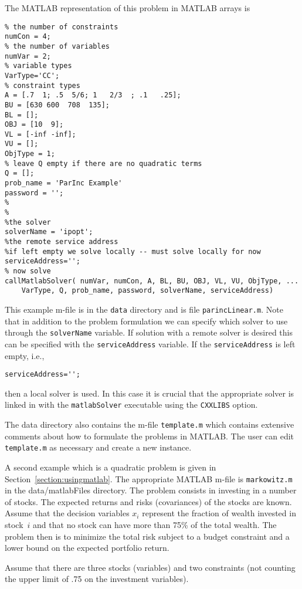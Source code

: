 The MATLAB representation of this problem in MATLAB arrays is
\begin{verbatim}
% the number of constraints
numCon = 4;
% the number of variables
numVar = 2;
% variable types
VarType='CC';
% constraint types
A = [.7  1; .5  5/6; 1   2/3  ; .1   .25];
BU = [630 600  708  135];
BL = [];
OBJ = [10  9];
VL = [-inf -inf];
VU = [];
ObjType = 1;
% leave Q empty if there are no quadratic terms
Q = [];
prob_name = 'ParInc Example'
password = '';
%
%
%the solver
solverName = 'ipopt';
%the remote service address
%if left empty we solve locally -- must solve locally for now
serviceAddress='';
% now solve
callMatlabSolver( numVar, numCon, A, BL, BU, OBJ, VL, VU, ObjType, ...
    VarType, Q, prob_name, password, solverName, serviceAddress)
\end{verbatim}
This example m-file is in the {\tt data} directory and is file {\tt parincLinear.m}. Note that in addition to the problem formulation
we can specify which solver to use through the {\tt solverName} variable.  If solution with a remote solver is desired
this can be specified with the {\tt serviceAddress} variable.  If the {\tt serviceAddress} is left empty, i.e.,
\begin{verbatim}
serviceAddress='';
\end{verbatim}
then a local solver is used. In this case  it is crucial that the appropriate solver is linked in with the {\tt matlabSolver}
executable using the {\tt CXXLIBS} option.


The data directory  also contains the m-file  {\tt template.m} which contains extensive comments about how to formulate
the problems in MATLAB.   The user can edit {\tt template.m} as necessary and create a new instance.




 A second example which is a quadratic problem is given in Section~\ref{section:usingmatlab}.
The appropriate MATLAB m-file is {\tt markowitz.m} in the {data/matlabFiles} directory.
The problem consists in investing  in a number of stocks. The expected returns and risks
(covariances) of the stocks are known. Assume that the decision variables $x_i$
represent the fraction of wealth invested in stock~$i$ and that no stock can have
more than 75\% of the total wealth. The problem then is to minimize the total risk
subject to a budget constraint and a lower bound on the expected portfolio return.

Assume that there are three stocks (variables) and two constraints (not counting the upper limit  %
of .75 on the investment variables).


